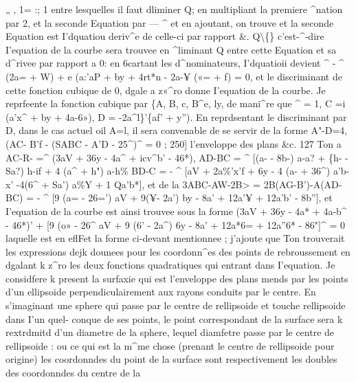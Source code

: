 \documentclass[11pt,a4paper]{book}
\begin{document}
„       ,  1=     :;  1
entre  lesquelles  il  faut  dliminer  Q;  en  multipliant  la  premiere  ^nation  par  2,  et  la
seconde  Equation  par  —  ^  et  en  ajoutant,  on  trouve
et  la  seconde  Equation  est  I'dquatiou  deriv^e  de  celle-ci  par  rapport  \&.  Q\textbackslash\{\}  c'est-^-dire
I'equation  de  la  courbe  sera  trouvee  en  ^liminant  Q  entre  cette  Equation  et  sa  d^rivee
par  rapport  a  0:   en  6cartant  les  d^nominateurs,  I'dquatioii  devient
^  -  ^  (2a=  +  W)  +  e  (a:'aP  +  by  +  4rt*n  -  2a-¥  («=  +  f)  =  0,
et  le  discriminant  de  cette  fonction  cubique  de  0,  dgale  a  z«^ro  donne  I'equation  de
la  courbe.
Je  reprfeente  la  fonction  cubique  par
\{A,  B,  c,  B^e,  ly,
de  mani^re  que
^  =  1,
C  =i  (a'x^  +  by  +  4a-6»),
D  =  -2a^l\}'\{af'  +  y'').
En  reprdsentant  le  discriminant  par  D,  dans  le  cas  actuel  oil  A=l,  il  sera  convenable
de  se  servir  de  la  forme
A"-D=4,(AC-  B'f  -  (SABC  -  A'D -  25^)^  =  0  ;
250]  l'enveloppe  des  plans  \&c.  127
Ton  a
AC-R-   =^ (3aV  +  36y -  4a^  +  icv^b'  -  46*),
AD-BC  =  ^  [(a-  -  8b-)  a-a?  +  \{h-  -  Sa?)  h-if  +  4  (a^  +  h")  a-h\%
BD-C  =  -  ^  [aV  +  2a\%'x'f  +  6y  -  4  (a-  +  36^)  a'b-x'  -4(6^  +  Sa')  a\%Y  +  1  Qa'b*],
et  de  la
3ABC-AW-2B>  =  2B(AG-B')-A(AD-BC)
=  -  ^  [9  (a=  -  26=')  aV  +  9(¥-  2a')  by  -  8a'  +  12a'¥  +  12a'b'  -  8b''],
et  I'equation  de  la  courbe  est  ainsi  trouvee  sous  la  forme
(3aV  +  36y  -  4a*  +  4a-b^  -  46*)'
+  [9  (o»  -  26^  aV  +  9  (6'  -  2a^)  6y  -  8a'  +  12a*6=  +  12a''6*  -  86"]^  =  0
laquelle  est  en  eflFet  la  forme  ci-devant  mentionnee ;  j'ajoute  que  Ton  trouverait  les
expressions  dejk  dounees  pour  les  coordonn^es  des  points  de  rebroussement  en  dgalant
k  z^ro  les  deux  fonctions  quadratiques  qui  entrant  dans  I'equation.
Je  considfere  k  present  la  surfaxie  qui  est  l'enveloppe  des  plans  mends  par  les  points
d'un  ellipsoide  perpendiculairement  aux  rayons  conduits  par  le  centre.  En  s'imaginant
une  sphere  qui  passe  par  le  centre  de  rellipsoide  et  touche  rellipsoide  dans  I'un  quel-
conque  de  ses  points,  le  point  correspondant  de  la  surface  sera  k  rextrdmitd  d'un
diametre  de  la  sphere,  lequel  diamfetre  passe  par  le  centre  de  rellipsoide :  ou  ce  qui
est  la  m^me  chose  (prenant  le  centre  de  rellipsoide  pour  origine)  les  coordonndes  du
point  de  la  surface  sont  respectivement  les  doubles  des  coordonndes  du  centre  de  la
\end{document}

